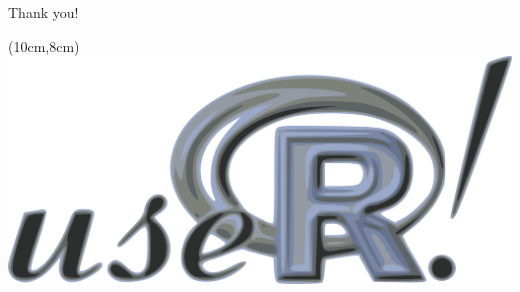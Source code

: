 \documentclass{beamer}
\begin{document}
\begin{frame}
\begin{columns}[T]
\begin{column}{.50\linewidth}
		\end{column}
	\end{columns}
	
	\pause
	
	\vspace{8mm}
	\centering
	
	\Large
	Thank you!
	
		\begin{textblock*}{2cm}(10cm,8cm)
		\includegraphics[width =\linewidth]{img/user.png}
	\end{textblock*}
	
\end{frame}
\end{document}
